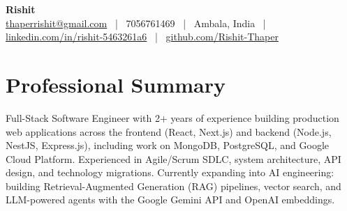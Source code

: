 \documentclass[10pt,a4paper]{article}
\begin{document}
\begin{center}
  {\Huge \textbf{Rishit}}\\[4pt]
  \href{mailto:thaperrishit@gmail.com}{thaperrishit@gmail.com} ~|~
  7056761469 ~|~
  Ambala, India ~|~
  \href{https://www.linkedin.com/in/rishit-5463261a6/}{linkedin.com/in/rishit-5463261a6} ~|~
  \href{https://github.com/Rishit-Thaper}{github.com/Rishit-Thaper}
\end{center}

\section*{Professional Summary}
Full-Stack Software Engineer with 2+ years of experience building production web applications across the frontend (React, Next.js) and backend (Node.js, NestJS, Express.js), including work on MongoDB, PostgreSQL, and Google Cloud Platform. Experienced in Agile/Scrum SDLC, system architecture, API design, and technology migrations. Currently expanding into AI engineering: building \mbox{Retrieval-Augmented} Generation (RAG) pipelines, vector search, and LLM-powered agents with the Google Gemini API and OpenAI embeddings.
\end{document}
